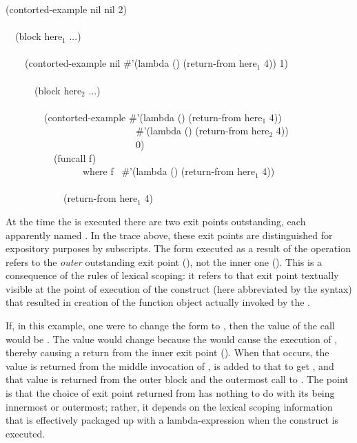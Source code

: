 \begin{lisp}
(contorted-example nil nil 2) \\
 \\
~~(block here${}_1$ ...) \\
 \\
~~~~(contorted-example nil \#'(lambda () (return-from here${}_1$ 4)) 1) \\
 \\
~~~~~~(block here${}_2$ ...) \\
 \\
~~~~~~~~(contorted-example \#'(lambda () (return-from here${}_1$ 4)) \\
~~~~~~~~~~~~~~~~~~~~~~~~~~~\#'(lambda () (return-from here${}_2$ 4)) \\
~~~~~~~~~~~~~~~~~~~~~~~~~~~0) \\
~~~~~~~~~~(funcall f) \\
~~~~~~~~~~~~~~~~{\rm where} f \EV\ \#'(lambda () (return-from here${}_1$ 4)) \\
 \\
~~~~~~~~~~~~(return-from here${}_1$ 4)
\end{lisp}

At the time the  is executed
there are two  exit points outstanding, each apparently
named .  In the trace above, these exit points are distinguished
for expository purposes by subscripts.
The  form executed as a result of the 
operation
refers to the \emph{outer} outstanding exit point
(), not the
inner one ().
This is a consequence of the rules of lexical scoping: it
refers to that exit point textually visible at the point of
execution of the 
construct (here abbreviated by the  syntax) that resulted
in creation of the function object actually invoked by the .

If, in this example, one were to change the form  to
, then the value of the call 
would be .  The value would change because the  would cause the
execution of , thereby causing
a return from the inner exit point ().
When that occurs, the value  is returned from the
middle invocation of ,  is added to that
to get , and that value is returned from the outer block
and the outermost call to .  The point
is that the choice of exit point returned from has nothing to do with its
being innermost or outermost; rather,
it depends on the lexical scoping information
that is effectively packaged up with a lambda-expression when the
 construct is executed.


